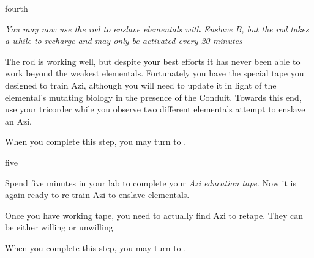 \documentclass[notebook]{elementals}
\begin{document}
\begin{page}{fourth}

\emph{You may now use the rod to enslave elementals with Enslave B, but the rod takes a while to recharge and may only be activated every 20 minutes}

The rod is working well, but despite your best efforts it has never been able to work beyond the weakest elementals. Fortunately you have the special tape you designed to train Azi, although you will need to update it in light of the elemental's mutating biology in the presence of the Conduit. Towards this end, use your tricorder while you observe two different elementals attempt to enslave an Azi.

When you complete this step, you may turn to .

\end{page}

\begin{page}{five}

Spend five minutes in your lab to complete your \emph{Azi education tape}. Now it is again ready to re-train Azi to enslave elementals.

Once you have working tape, you need to actually find Azi to retape. They can be either willing or unwilling

When you complete this step, you may turn to .

\end{page}

\endnotebook
\end{document}
